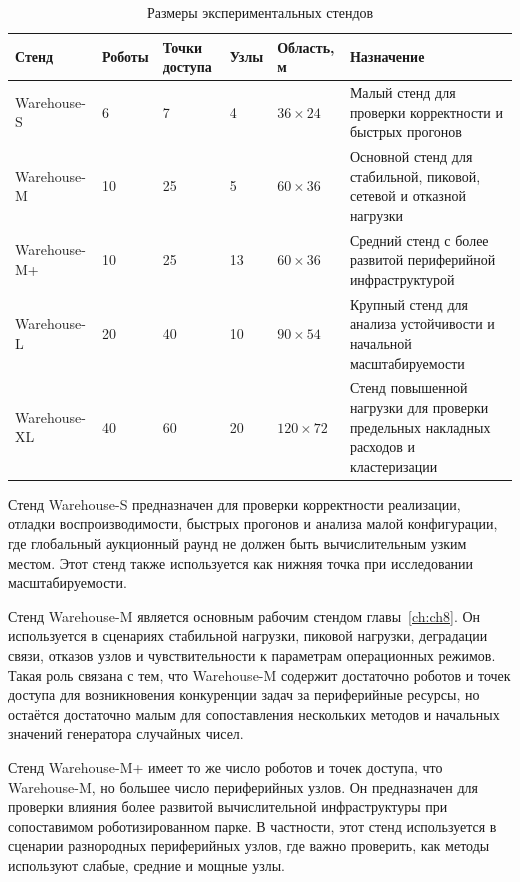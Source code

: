 \begin{table}[h]
	\centering
	\small
	\caption{Размеры экспериментальных стендов}
	\label{tab:warehouse_scenario_sizes_final}
	\begin{tabular}{|p{}|p{}|p{}|p{}|p{}|p{}|}
		\hline
		\textbf{Стенд} & \textbf{Роботы} & \textbf{Точки доступа} & \textbf{Узлы} & \textbf{Область, м} & \textbf{Назначение} \\
		\hline
		Warehouse-S & 6 & 7 & 4 & $36 \times 24$ & Малый стенд для проверки корректности и быстрых прогонов \\
		\hline
		Warehouse-M & 10 & 25 & 5 & $60 \times 36$ & Основной стенд для стабильной, пиковой, сетевой и отказной нагрузки \\
		\hline
		Warehouse-M+ & 10 & 25 & 13 & $60 \times 36$ & Средний стенд с более развитой периферийной инфраструктурой \\
		\hline
		Warehouse-L & 20 & 40 & 10 & $90 \times 54$ & Крупный стенд для анализа устойчивости и начальной масштабируемости \\
		\hline
		Warehouse-XL & 40 & 60 & 20 & $120 \times 72$ & Стенд повышенной нагрузки для проверки предельных накладных расходов и кластеризации \\
		\hline
	\end{tabular}
\end{table}

Стенд Warehouse-S предназначен для проверки корректности реализации, отладки воспроизводимости, быстрых прогонов и анализа малой конфигурации, где глобальный аукционный раунд не должен быть вычислительным узким местом. Этот стенд также используется как нижняя точка при исследовании масштабируемости.

Стенд Warehouse-M является основным рабочим стендом главы~\ref{ch:ch8}. Он используется в сценариях стабильной нагрузки, пиковой нагрузки, деградации связи, отказов узлов и чувствительности к параметрам операционных режимов. Такая роль связана с тем, что Warehouse-M содержит достаточно роботов и точек доступа для возникновения конкуренции задач за периферийные ресурсы, но остаётся достаточно малым для сопоставления нескольких методов и начальных значений генератора случайных чисел.

Стенд Warehouse-M+ имеет то же число роботов и точек доступа, что Warehouse-M, но большее число периферийных узлов. Он предназначен для проверки влияния более развитой вычислительной инфраструктуры при сопоставимом роботизированном парке. В частности, этот стенд используется в сценарии разнородных периферийных узлов, где важно проверить, как методы используют слабые, средние и мощные узлы.

